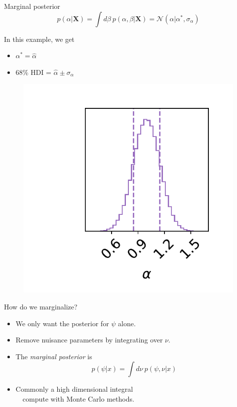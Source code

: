 \documentclass[
aspectratio=169,
14pt,
professionalfonts
]{beamer}
\newcommand{\arrow}{~\ding{220}~}
\begin{document}
\begin{frame}{Marginal posterior}
\vspace{-1cm}
    $$p(\alpha|\boldsymbol{X}) = \int d\beta ~ p(\alpha, \beta|\boldsymbol{X}) = \mathcal{N}(\alpha | \alpha^*, \sigma_{\alpha})$$
    \begin{minipage}{0.4\linewidth}
    In this example, we get
        \begin{itemize}
            \item $\alpha^* = \hat \alpha$
            \item 68\% HDI = $\hat \alpha \pm \sigma_{\alpha}$
        \end{itemize}
    \end{minipage}
    \begin{minipage}{0.59\linewidth}
    \begin{figure}
        \centering
        \includegraphics[width=0.7\linewidth]{../plots/marginal_posterior.pdf}
    \end{figure}
    \end{minipage}
\end{frame}

\begin{frame}{How do we marginalize?}
    \begin{itemize}
        \item We only want the posterior for $\psi$ alone.
        \item Remove nuisance parameters by integrating over $\nu$.
        \item[\arrow] The \textit{marginal posterior} is
            $$
            p(\psi | x) = \int d\nu ~ p(\psi, \nu | x)
            $$
        \item Commonly a high dimensional integral\\ \arrow compute with Monte Carlo methods.
    \end{itemize}
\end{frame}
\end{document}
